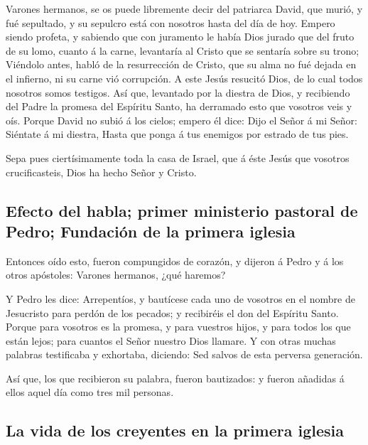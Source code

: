  Varones hermanos, se os puede libremente decir del
patriarca David, que murió, y fué sepultado, y su sepulcro está con
nosotros hasta del día de hoy.  Empero siendo profeta, y
sabiendo que con juramento le había Dios jurado que del fruto de su
lomo, cuanto á la carne, levantaría al Cristo que se sentaría sobre su
trono;  Viéndolo antes, habló de la resurrección de
Cristo, que su alma no fué dejada en el infierno, ni su carne vió
corrupción.  A este Jesús resucitó Dios, de lo cual todos
nosotros somos testigos.  Así que, levantado por la
diestra de Dios, y recibiendo del Padre la promesa del Espíritu Santo,
ha derramado esto que vosotros veis y oís.  Porque David
no subió á los cielos; empero él dice: Dijo el Señor á mi Señor:
Siéntate á mi diestra,  Hasta que ponga á tus enemigos
por estrado de tus pies.

 Sepa pues ciertísimamente toda la casa de Israel, que á
éste Jesús que vosotros crucificasteis, Dios ha hecho Señor y Cristo.

\hypertarget{efecto-del-habla-primer-ministerio-pastoral-de-pedro-fundaciuxf3n-de-la-primera-iglesia}{%
\subsection{Efecto del habla; primer ministerio pastoral de Pedro;
Fundación de la primera
iglesia}\label{efecto-del-habla-primer-ministerio-pastoral-de-pedro-fundaciuxf3n-de-la-primera-iglesia}}

 Entonces oído esto, fueron compungidos de corazón, y
dijeron á Pedro y á los otros apóstoles: Varones hermanos, ¿qué haremos?

 Y Pedro les dice: Arrepentíos, y bautícese cada uno de
vosotros en el nombre de Jesucristo para perdón de los pecados; y
recibiréis el don del Espíritu Santo.  Porque para
vosotros es la promesa, y para vuestros hijos, y para todos los que
están lejos; para cuantos el Señor nuestro Dios llamare. 
Y con otras muchas palabras testificaba y exhortaba, diciendo: Sed
salvos de esta perversa generación.

 Así que, los que recibieron su palabra, fueron
bautizados: y fueron añadidas á ellos aquel día como tres mil personas.

\hypertarget{la-vida-de-los-creyentes-en-la-primera-iglesia}{%
\subsection{La vida de los creyentes en la primera
iglesia}\label{la-vida-de-los-creyentes-en-la-primera-iglesia}}

